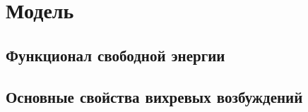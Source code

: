 \chapter{Модель}

\section{Функционал свободной энергии}

\section{Основные свойства вихревых возбуждений}
